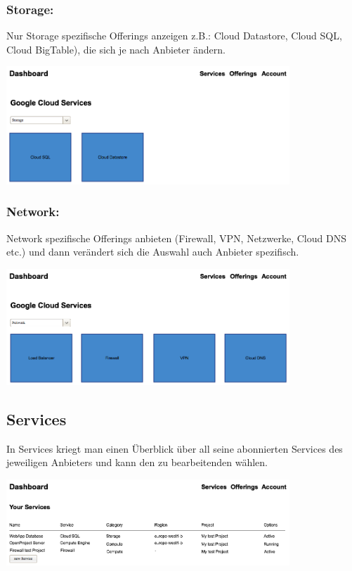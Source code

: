 \subsubsection{Storage:}

Nur Storage spezifische Offerings anzeigen z.B.: Cloud Datastore, Cloud SQL, 
Cloud BigTable), die sich je nach Anbieter ändern.

  \includegraphics[width=0.8\textwidth]{./03_Analyse/03_Dashboard/images/homescreen_google_storage}



\subsubsection{Network:}
Network spezifische Offerings anbieten (Firewall, VPN, Netzwerke, Cloud DNS etc.) 
und dann verändert sich die Auswahl auch Anbieter spezifisch.

  \includegraphics[width=0.8\textwidth]{./03_Analyse/03_Dashboard/images/homescreen_google_network}




\subsection{Services}
In Services kriegt man einen Überblick über all seine abonnierten Services des jeweiligen 
Anbieters und kann den zu bearbeitenden wählen.

\includegraphics[width=0.8\textwidth]{./03_Analyse/03_Dashboard/images/services_overview}


